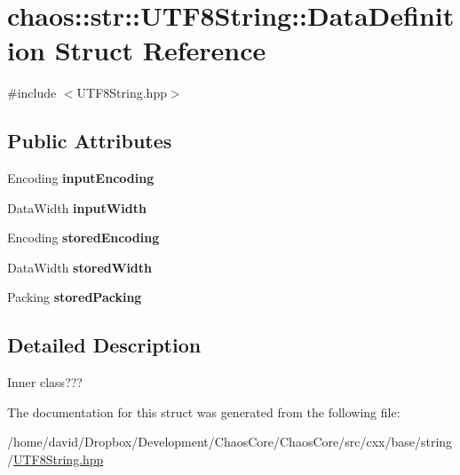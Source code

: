 \hypertarget{structchaos_1_1str_1_1_u_t_f8_string_1_1_data_definition}{\section{chaos\-:\-:str\-:\-:U\-T\-F8\-String\-:\-:Data\-Definition Struct Reference}
\label{structchaos_1_1str_1_1_u_t_f8_string_1_1_data_definition}
}


{\ttfamily \#include $<$U\-T\-F8\-String.\-hpp$>$}

\subsection*{Public Attributes}
\begin{DoxyCompactItemize}
\item 
\hypertarget{structchaos_1_1str_1_1_u_t_f8_string_1_1_data_definition_a56041af9c203ee63ce8385c0d1ea18c0}{Encoding {\bfseries input\-Encoding}}\label{structchaos_1_1str_1_1_u_t_f8_string_1_1_data_definition_a56041af9c203ee63ce8385c0d1ea18c0}

\item 
\hypertarget{structchaos_1_1str_1_1_u_t_f8_string_1_1_data_definition_a25ce77cacbe23d6e749fe1d2510dabc0}{Data\-Width {\bfseries input\-Width}}\label{structchaos_1_1str_1_1_u_t_f8_string_1_1_data_definition_a25ce77cacbe23d6e749fe1d2510dabc0}

\item 
\hypertarget{structchaos_1_1str_1_1_u_t_f8_string_1_1_data_definition_a11750952cc0faa93ed2dee91e3ac04bc}{Encoding {\bfseries stored\-Encoding}}\label{structchaos_1_1str_1_1_u_t_f8_string_1_1_data_definition_a11750952cc0faa93ed2dee91e3ac04bc}

\item 
\hypertarget{structchaos_1_1str_1_1_u_t_f8_string_1_1_data_definition_aa49987ae550b4d5393c1881acd0d3001}{Data\-Width {\bfseries stored\-Width}}\label{structchaos_1_1str_1_1_u_t_f8_string_1_1_data_definition_aa49987ae550b4d5393c1881acd0d3001}

\item 
\hypertarget{structchaos_1_1str_1_1_u_t_f8_string_1_1_data_definition_a1f7dadf7e81002345c58a814361ffee7}{Packing {\bfseries stored\-Packing}}\label{structchaos_1_1str_1_1_u_t_f8_string_1_1_data_definition_a1f7dadf7e81002345c58a814361ffee7}

\end{DoxyCompactItemize}


\subsection{Detailed Description}
Inner class??? 

The documentation for this struct was generated from the following file\-:\begin{DoxyCompactItemize}
\item 
/home/david/\-Dropbox/\-Development/\-Chaos\-Core/\-Chaos\-Core/src/cxx/base/string/\hyperlink{_u_t_f8_string_8hpp}{U\-T\-F8\-String.\-hpp}\end{DoxyCompactItemize}
